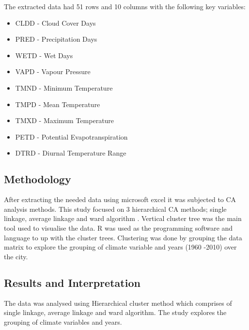 \documentclass[12pt,a4paper]{article}
\begin{document}
\noindent The extracted data had 51 rows and 10 columns with the following key variables:
\begin{itemize}
	\item CLDD - Cloud Cover Days
	\item PRED - Precipitation Days
	\item WETD - Wet Days
	\item  VAPD - Vapour Pressure
	\item TMND - Minimum Temperature
	\item TMPD - Mean Temperature
	\item TMXD - Maximum Temperature
	\item PETD - Potential Evapotranspiration
	\item DTRD - Diurnal Temperature Range
\end{itemize}

 
\subsection{Methodology} 
 After extracting the needed data using microsoft excel it was subjected to CA analysis methods. This study focused on 3 hierarchical CA methods; single linkage, average linkage and ward algorithm \cite{vermunt2002latent}. Vertical cluster tree was the main tool used to visualise the data. R was used as the programming software and language to up with the cluster trees. Clustering was done by grouping the data matrix to explore the grouping of climate variable and years (1960 -2010) over the city.
\subsection{Results and Interpretation}
The data was analysed using Hierarchical cluster method which comprises of single linkage, average linkage and ward algorithm. The study explores the grouping of climate variables and years.
\end{document}
